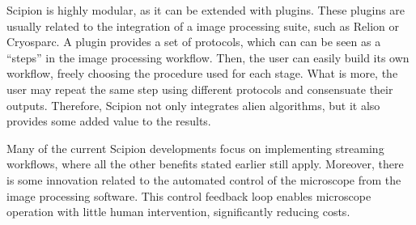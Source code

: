 \documentclass[../main.tex]{subfiles}
\begin{document}
Scipion is highly modular, as it can be extended with plugins. These plugins are usually related to the integration of a image processing suite, such as Relion or Cryosparc. A plugin provides a set of protocols, which can can be seen as a ``steps'' in the image processing workflow. Then, the user can easily build its own workflow, freely choosing the procedure used for each stage. What is more, the user may repeat the same step using different protocols and consensuate their outputs. Therefore, Scipion not only integrates alien algorithms, but it also provides some added value to the results.

Many of the current Scipion developments focus on implementing streaming workflows, where all the other benefits stated earlier still apply. Moreover, there is some innovation related to the automated control of the microscope from the image processing software. This control feedback loop enables microscope operation with little human intervention, significantly reducing costs.
\end{document}
